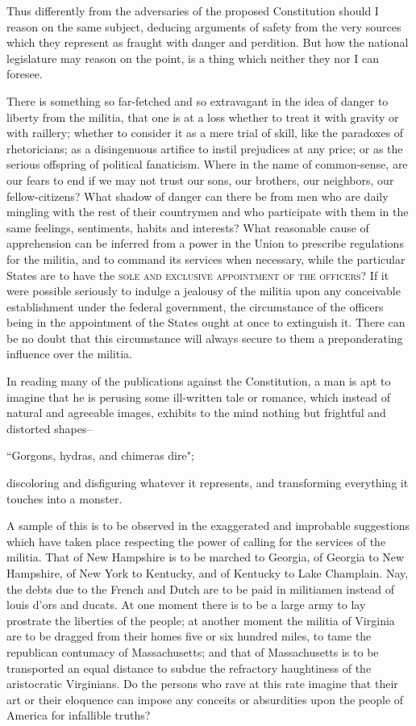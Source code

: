 Thus differently from the adversaries of the proposed Constitution should I reason on the same subject, deducing arguments of safety from the very sources which they represent as fraught with danger and perdition. 
But how the national legislature may reason on the point, is a thing which neither they nor I can foresee.

There is something so far-fetched and so extravagant in the idea of danger to liberty from the militia, that one is at a loss whether to treat it with gravity or with raillery; whether to consider it as a mere trial of skill, like the paradoxes of rhetoricians; as a disingenuous artifice to instil prejudices at any price; or as the serious offspring of political fanaticism. 
Where in the name of common-sense, are our fears to end if we may not trust our sons, our brothers, our neighbors, our fellow-citizens? 
What shadow of danger can there be from men who are daily mingling with the rest of their countrymen and who participate with them in the same feelings, sentiments, habits and interests? 
What reasonable cause of apprehension can be inferred from a power in the Union to prescribe regulations for the militia, and to command its services when necessary, while the particular States are to have the \textsc{sole and exclusive appointment of the officers}? 
If it were possible seriously to indulge a jealousy of the militia upon any conceivable establishment under the federal government, the circumstance of the officers being in the appointment of the States ought at once to extinguish it. 
There can be no doubt that this circumstance will always secure to them a preponderating influence over the militia.

In reading many of the publications against the Constitution, a man is apt to imagine that he is perusing some ill-written tale or romance, which instead of natural and agreeable images, exhibits to the mind nothing but frightful and distorted shapes--

                ``Gorgons, hydras, and chimeras dire";

discoloring and disfiguring whatever it represents, and transforming everything it touches into a monster.

A sample of this is to be observed in the exaggerated and improbable suggestions which have taken place respecting the power of calling for the services of the militia. 
That of New Hampshire is to be marched to Georgia, of Georgia to New Hampshire, of New York to Kentucky, and of Kentucky to Lake Champlain. 
Nay, the debts due to the French and Dutch are to be paid in militiamen instead of louis d'ors and ducats. 
At one moment there is to be a large army to lay prostrate the liberties of the people; at another moment the militia of Virginia are to be dragged from their homes five or six hundred miles, to tame the republican contumacy of Massachusetts; and that of Massachusetts is to be transported an equal distance to subdue the refractory haughtiness of the aristocratic Virginians. 
Do the persons who rave at this rate imagine that their art or their eloquence can impose any conceits or absurdities upon the people of America for infallible truths?

